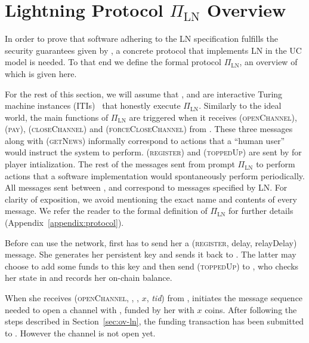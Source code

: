 \section{Lightning Protocol $\Pi_{\mathrm{LN}}$ Overview}
\label{sec:ov-protocol}

  In order to prove that software adhering to the LN specification fulfills the
  security guarantees given by \fpaynet, a concrete protocol that implements LN
  in the UC model is needed. To that end we define the formal protocol
  $\Pi_{\mathrm{LN}}$, an overview of which is given here.

  For the rest of this section, we will assume that \alice, \bob{} and
  \charlie{} are interactive Turing machine instances (ITIs)~\cite{uc} that
  honestly execute $\Pi_{\mathrm{LN}}$. Similarly to the ideal world, the main
  functions of $\Pi_{\mathrm{LN}}$ are triggered when it receives
  (\textsc{openChannel}), (\textsc{pay}), (\textsc{closeChannel}) and
  (\textsc{forceCloseChannel}) from \environment{}. These three messages along
  with (\textsc{getNews}) informally correspond to actions that a ``human user''
  would instruct the system to perform. (\textsc{register}) and
  (\textsc{toppedUp}) are sent by \environment{} for player intialization. The
  rest of the messages sent from \environment{} prompt $\Pi_{\mathrm{LN}}$ to
  perform actions that a software implementation would spontaneously perform
  periodically. All messages sent between \alice, \bob{} and \charlie{}
  correspond to messages specified by LN. For clarity of exposition, we avoid
  mentioning the exact name and contents of every message. We refer the reader
  to the formal definition of $\Pi_{\mathrm{LN}}$ for further details
  (Appendix~\ref{appendix:protocol}).

    Before \alice{} can use the network, \environment{} first has to send her a
    (\textsc{register}, delay, relayDelay) message. She generates her
    persistent key and sends it back to \environment{}. The latter may choose to
    add some funds to this key and then send (\textsc{toppedUp}) to \alice, who
    checks her state in \ledger{} and records her on-chain balance.

    When she receives (\textsc{openChannel}, \alice, \bob, $x$, \textit{tid})
    from \environment, \alice{} initiates the message sequence needed to open a
    channel with \bob, funded by her with $x$ coins. After following the steps
    described in Section~\ref{sec:ov-ln}, the funding transaction has been
    submitted to \ledger. However the channel is not open yet.

